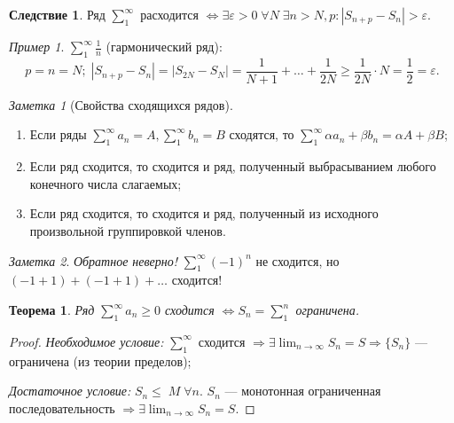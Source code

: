 \documentclass[a4paper,12pt]{article}
\newtheorem*{theorem}{Теорема}
\theoremstyle{remark}
\newtheorem*{note}{Заметка}
\newtheorem*{example}{Пример}
\theoremstyle{definition}
\newtheorem*{effect}{Следствие}
\begin{document}
\begin{effect}
    Ряд \(\sum^\infty_1\) расходится \(\Leftrightarrow \exists \varepsilon > 0\; \forall N\; \exists n > N, p: |S_{n + p} - S_n| > \varepsilon\).
\end{effect}

\begin{example}
    \(\sum^\infty_1 \frac{1}{n}\) (гармонический ряд):
    \begin{equation*}
        p = n = N;\; |S_{n+p} - S_n| = |S_{2N} - S_N| = \frac{1}{N+1} + \dots + \frac{1}{2N} \geqslant \frac{1}{2N} \cdot N = \frac{1}{2} = \varepsilon.
    \end{equation*}
\end{example}

\begin{note}[Свойства сходящихся рядов]
    \begin{enumerate}
        \item Если ряды \(\sum_{1}^{\infty} a_n = A, \sum_{1}^{\infty} b_n = B\) сходятся, то \(\sum_{1}^{\infty} \alpha a_n + \beta b_n = \alpha A + \beta B\);
        \item Если ряд сходится, то сходится и ряд, полученный выбрасыванием любого конечного числа слагаемых;
        \item Если ряд сходится, то сходится и ряд, полученный из исходного произвольной группировкой членов.
    \end{enumerate}
\end{note}

\begin{note}
    \emph{Обратное неверно!} \(\sum_{1}^{\infty} (-1)^n\) не сходится, но \((-1 + 1) + (-1 + 1) + \dots\) сходится!
\end{note}

\begin{theorem}
    Ряд \(\sum_{1}^{\infty} a_n \geqslant 0\) сходится \(\Leftrightarrow S_n = \sum_{1}^{n}\) ограничена.
\end{theorem}

\begin{proof}
    \emph{Необходимое условие:} \(\sum_{1}^{\infty}\) сходится \(\Rightarrow \exists \lim_{n \rightarrow \infty} S_n = S \Rightarrow \{S_n\}\) --- ограничена (из теории пределов);

    \emph{Достаточное условие:} \(S_n \leqslant\; M\; \forall n\). \(S_n\) --- монотонная ограниченная последовательность \(\Rightarrow \exists \lim_{n \rightarrow \infty} S_n = S\).
\end{proof}
\end{document}
